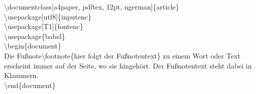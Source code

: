 \color{nounibaredI}\color{nounibaredI}\textbackslash documentclass\color{black}\color{nounibagreenI}[a4paper, pdftex, 12pt, ngerman]\color{black}\{article\} \\
\color{nounibaredI}\color{nounibaredI}\textbackslash usepackage\color{black}\color{nounibagreenI}[utf8]\color{black}\{inputenc\} \\
\color{nounibaredI}\color{nounibaredI}\textbackslash usepackage\color{black}\color{nounibagreenI}[T1]\color{black}\{fontenc\} \\
\color{nounibaredI}\color{nounibaredI}\textbackslash usepackage\color{black}\{babel\} \\
\color{nounibaredI}\color{unibablueI}\textbackslash\color{unibablueI}begin\color{black}\color{black}\{document\} \\
Die Fußnote\color{nounibaredI}\color{nounibaredI}\textbackslash footnote\color{black}\{hier folgt der Fußnotentext\} zu einem Wort oder Text erscheint immer auf der Seite, wo sie hingehört. Der Fußnotentext steht dabei in Klammern.\\
\color{unibablueI}\textbackslash\color{unibablueI}end\color{black}\color{black}\{document\} \\
